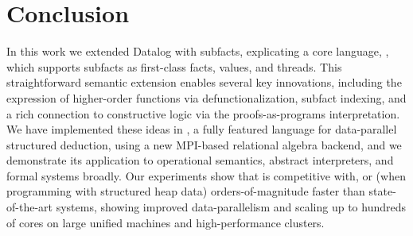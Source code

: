 \section{Conclusion}
\label{sec:conclusion}

In this work we extended Datalog with subfacts,
explicating a core language, \core{}, which supports subfacts as
first-class facts, values, and threads. This straightforward semantic extension enables
several key innovations, including the expression of higher-order
functions via defunctionalization, subfact indexing,
and a rich connection to constructive logic via the proofs-as-programs
interpretation. We have implemented these ideas in \slog{}, a fully featured language
for data-parallel structured deduction, using a new MPI-based relational algebra backend,
and we demonstrate its application to operational semantics, abstract interpreters, and
formal systems broadly. Our experiments show that \slog{} is competitive with,
or (when programming with structured heap data) orders-of-magnitude faster
than state-of-the-art systems, showing improved data-parallelism and scaling
up to hundreds of cores on large unified machines and high-performance clusters.

